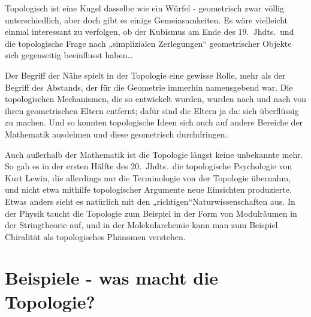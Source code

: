 \documentclass[12pt]{book}   %
\begin{document}
Topologisch ist eine Kugel dasselbe wie ein Würfel - geometrisch zwar 
völlig unterschiedlich, aber doch gibt es einige Gemeinsamkeiten. 
Es wäre vielleicht einmal interessant zu verfolgen, ob der Kubismus am Ende
des 19.\ Jhdts.\ und die topologische Frage nach „simplizialen 
Zerlegungen“ geometrischer Objekte sich gegenseitig beeinflusst haben\dots

Der Begriff der Nähe spielt in der Topologie eine gewisse Rolle, mehr als der
Begriff des Abstands, der für die Geometrie immerhin namensgebend war.
Die topologischen 
Mechanismen, die so entwickelt wurden, wurden nach und nach von ihren 
geometrischen Eltern entfernt; dafür sind die Eltern ja da: sich 
überflüssig zu machen. Und so konnten topologische Ideen sich auch auf 
andere Bereiche der Mathematik ausdehnen und diese geometrisch durchdringen.

Auch außerhalb der Mathematik ist die Topologie längst keine unbekannte
mehr. So gab es in der ersten Hälfte des 20.\ Jhdts.\ die topologische 
Psychologie von Kurt Lewin, die allerdings nur die Terminologie von der 
Topologie übernahm, und nicht etwa mithilfe topologischer Argumente neue
Einsichten produzierte. Etwas anders sieht es natürlich mit den 
„richtigen“Naturwissenschaften aus. In der Physik taucht
die Topologie zum Beispiel in der Form von Modulräumen in der Stringtheorie 
auf, und in der Molekularchemie kann man zum Beispiel Chiralität als
topologisches Phänomen verstehen.



\section{Beispiele - was macht die Topologie?}
\end{document}
